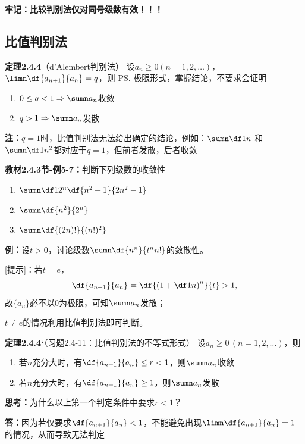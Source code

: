 {\b\bf 牢记：比较判别法仅对同号级数有效！！！}

\subsection{比值判别法}

{\bf 定理2.4.4}（d'Alembert判别法）
设$a_n\geq 0(n=1,2,\ldots)$，$\limn\df{a_{n+1}}{a_n}=q$，则
\ps{极限形式，掌握结论，不要求会证明} 
\begin{enumerate}
  \setlength{\itemindent}{1cm}
  \item $0\leq q<1\Rightarrow\sumn a_n$收敛 
  \item $q>1\Rightarrow\sumn a_n$发散
\end{enumerate}

{\bf 注：}$q=1$时，比值判别法无法给出确定的结论，例如：$\sumn\df 1n$
和$\sumn\df 1{n^2}$都对应于$q=1$，但前者发散，后者收敛

{\bf 教材2.4.3节-例5-7：}判断下列级数的收敛性
\begin{enumerate} [(1)]
  \setlength{\itemindent}{1cm}
  \item $\sumn\df 1{2^n}\df{n^2+1}{2n^2-1}$ 
  \item $\sumn\df{n^2}{2^n}$ 
  \item $\sumn\df{(2n)!}{(n!)^2}$
\end{enumerate}

{\bf 例：}设$t>0$，讨论级数$\sumn\df{n^n}{t^nn!}$的敛散性。

[提示]：若$t=e$，
$$\df{a_{n+1}}{a_n}=\df{\left(1+\df1n\right)^n}{t}>1,$$
故$\{a_n\}$必不以$0$为极限，可知$\sumn a_n$发散；

$t\ne e$的情况利用比值判别法即可判断。

{\bf 定理2.4.4‘}（习题2.4-11：比值判别法的不等式形式）
设$a_n\geq 0\,(n=1,2,\ldots)$，则 
\begin{enumerate}
  \setlength{\itemindent}{1cm}
  \item 若$n$充分大时，有$\df{a_{n+1}}{a_n}\leq r<1$，则$\sumn a_n$收敛 
  \item 若$n$充分大时，有$\df{a_{n+1}}{a_n}\geq 1$，则$\sumn a_n$发散 
\end{enumerate}

{\b {\bf 思考：}为什么以上第一个判定条件中要求$r<1$？

{\bf 答：}因为若仅要求$\df{a_{n+1}}{a_n}<1$，不能避免出现$\limn\df{a_{n+1}}{a_n}=1$
的情况，从而导致无法判定}

